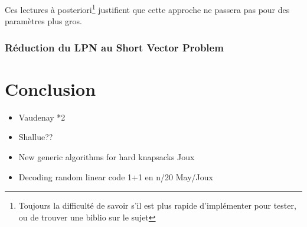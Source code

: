 \documentclass{article}		%
\begin{document}
Ces lectures à posteriori\footnote{Toujours la difficulté de savoir s'il
est plus rapide d'implémenter pour tester, ou de trouver une biblio sur
le sujet} justifient que cette approche ne passera pas pour
des paramètres plus gros. 

\subsubsection{Réduction du LPN au Short Vector Problem}


\section{Conclusion}

\begin{itemize}
\item Vaudenay *2
\item Shallue??
\item New generic algorithms for hard knapsacks Joux
\item Decoding random linear code 1+1 en n/20 May/Joux
\end{itemize}



\end{document}

